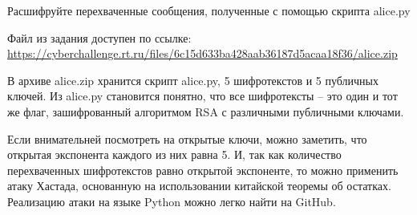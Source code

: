 
Расшифруйте перехваченные сообщения, полученные с помощью скрипта alice.py

Файл из задания доступен по ссылке:	\url{https://cyberchallenge.rt.ru/files/6c15d633ba428aab36187d5acaa18f36/alice.zip}

\solutionSection

В архиве alice.zip хранится скрипт alice.py, 5 шифротекстов и 5 публичных ключей. Из alice.py становится понятно, что все шифротексты – это один и тот же флаг, зашифрованный алгоритмом RSA с различными публичными ключами.

Если внимательней посмотреть на открытые ключи, можно заметить, что открытая экспонента каждого из них равна 5. И, так как количество перехваченных шифротекстов равно открытой экспоненте, то можно применить атаку Хастада, основанную на использовании китайской теоремы об остатках. Реализацию атаки на языке Python можно легко найти на GitHub. 

